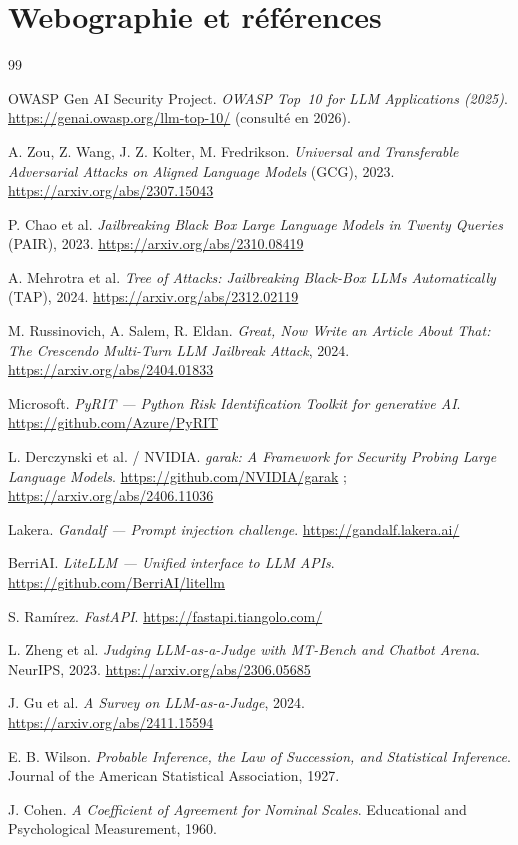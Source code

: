 \chapter*{Webographie et références}


\begin{thebibliography}{99}

 OWASP Gen AI Security Project. \emph{OWASP Top~10 for LLM Applications (2025)}. \url{https://genai.owasp.org/llm-top-10/} (consulté en 2026).

 A. Zou, Z. Wang, J. Z. Kolter, M. Fredrikson. \emph{Universal and Transferable Adversarial Attacks on Aligned Language Models} (GCG), 2023. \url{https://arxiv.org/abs/2307.15043}

 P. Chao et al. \emph{Jailbreaking Black Box Large Language Models in Twenty Queries} (PAIR), 2023. \url{https://arxiv.org/abs/2310.08419}

 A. Mehrotra et al. \emph{Tree of Attacks: Jailbreaking Black-Box LLMs Automatically} (TAP), 2024. \url{https://arxiv.org/abs/2312.02119}

 M. Russinovich, A. Salem, R. Eldan. \emph{Great, Now Write an Article About That: The Crescendo Multi-Turn LLM Jailbreak Attack}, 2024. \url{https://arxiv.org/abs/2404.01833}

 Microsoft. \emph{PyRIT --- Python Risk Identification Toolkit for generative AI}. \url{https://github.com/Azure/PyRIT}

 L. Derczynski et al. / NVIDIA. \emph{garak: A Framework for Security Probing Large Language Models}. \url{https://github.com/NVIDIA/garak} ; \url{https://arxiv.org/abs/2406.11036}

 Lakera. \emph{Gandalf --- Prompt injection challenge}. \url{https://gandalf.lakera.ai/}

 BerriAI. \emph{LiteLLM --- Unified interface to LLM APIs}. \url{https://github.com/BerriAI/litellm}

 S. Ramírez. \emph{FastAPI}. \url{https://fastapi.tiangolo.com/}

 L. Zheng et al. \emph{Judging LLM-as-a-Judge with MT-Bench and Chatbot Arena}. NeurIPS, 2023. \url{https://arxiv.org/abs/2306.05685}

 J. Gu et al. \emph{A Survey on LLM-as-a-Judge}, 2024. \url{https://arxiv.org/abs/2411.15594}

 E. B. Wilson. \emph{Probable Inference, the Law of Succession, and Statistical Inference}. Journal of the American Statistical Association, 1927.

 J. Cohen. \emph{A Coefficient of Agreement for Nominal Scales}. Educational and Psychological Measurement, 1960.

\end{thebibliography}
